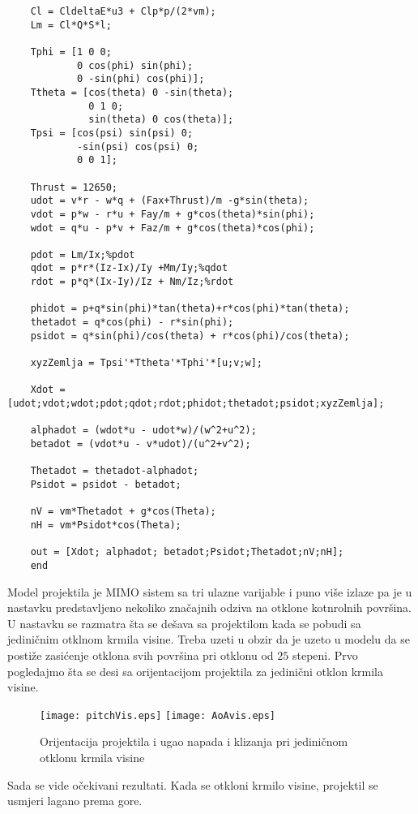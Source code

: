 \begin{lstlisting}
    Cl = CldeltaE*u3 + Clp*p/(2*vm);
    Lm = Cl*Q*S*l;
    
    Tphi = [1 0 0;
            0 cos(phi) sin(phi);
            0 -sin(phi) cos(phi)];
    Ttheta = [cos(theta) 0 -sin(theta);
              0 1 0;
              sin(theta) 0 cos(theta)];
    Tpsi = [cos(psi) sin(psi) 0;
            -sin(psi) cos(psi) 0;
            0 0 1];
    
    Thrust = 12650;
    udot = v*r - w*q + (Fax+Thrust)/m -g*sin(theta);
    vdot = p*w - r*u + Fay/m + g*cos(theta)*sin(phi);
    wdot = q*u - p*v + Faz/m + g*cos(theta)*cos(phi);
    
    pdot = Lm/Ix;%pdot
    qdot = p*r*(Iz-Ix)/Iy +Mm/Iy;%qdot
    rdot = p*q*(Ix-Iy)/Iz + Nm/Iz;%rdot
    
    phidot = p+q*sin(phi)*tan(theta)+r*cos(phi)*tan(theta);
    thetadot = q*cos(phi) - r*sin(phi);
    psidot = q*sin(phi)/cos(theta) + r*cos(phi)/cos(theta);
    
    xyzZemlja = Tpsi'*Ttheta'*Tphi'*[u;v;w];
    
    Xdot = [udot;vdot;wdot;pdot;qdot;rdot;phidot;thetadot;psidot;xyzZemlja];
    
    alphadot = (wdot*u - udot*w)/(w^2+u^2);
    betadot = (vdot*u - v*udot)/(u^2+v^2);
    
    Thetadot = thetadot-alphadot;
    Psidot = psidot - betadot;
    
    nV = vm*Thetadot + g*cos(Theta);
    nH = vm*Psidot*cos(Theta);
    
    out = [Xdot; alphadot; betadot;Psidot;Thetadot;nV;nH];
    end
    \end{lstlisting}
Model projektila je MIMO sistem sa tri ulazne varijable i puno više izlaze pa je u nastavku 
predstavljeno nekoliko značajnih odziva na otklone kotnrolnih površina. U nastavku se razmatra 
šta se dešava sa projektilom kada se pobudi sa jediničnim otklnom krmila visine. Treba uzeti u obzir 
da je uzeto u modelu da se postiže zasićenje otklona svih površina pri otklonu od $25$ stepeni.
Prvo pogledajmo šta se desi sa orijentacijom projektila za jedinični otklon krmila visine. 
\begin{figure}[!ht]
    \centering
    \texttt{[image: pitchVis.eps]}
    \texttt{[image: AoAvis.eps]}
    \caption{Orijentacija projektila i ugao napada i klizanja pri jediničnom otklonu krmila 
    visine}
\end{figure}
Sada se vide očekivani rezultati. Kada se otkloni krmilo visine, projektil se usmjeri lagano prema gore. 
